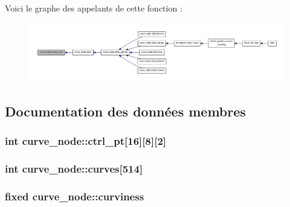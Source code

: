 Voici le graphe des appelants de cette fonction \+:\nopagebreak
\begin{figure}[H]
\begin{center}
\leavevmode
\includegraphics[width=350pt]{classcurve__node_abc1a06d649c6dce22334da762f2955b8_icgraph}
\end{center}
\end{figure}




\subsection{Documentation des données membres}
\hypertarget{classcurve__node_ab7280e17d47152797e10e5992791ee9b}{
\subsubsection[{ctrl\+\_\+pt}]{\setlength{\rightskip}{0pt plus 5cm}int curve\+\_\+node\+::ctrl\+\_\+pt\mbox{[}16\mbox{]}\mbox{[}8\mbox{]}\mbox{[}2\mbox{]}\hspace{0.3cm}{\ttfamily [static]}}}\label{classcurve__node_ab7280e17d47152797e10e5992791ee9b}
\hypertarget{classcurve__node_a0aebfec8e10d7fc02442cd5326433c93}{
\subsubsection[{curves}]{\setlength{\rightskip}{0pt plus 5cm}int curve\+\_\+node\+::curves\mbox{[}514\mbox{]}\hspace{0.3cm}{\ttfamily [static]}}}\label{classcurve__node_a0aebfec8e10d7fc02442cd5326433c93}
\hypertarget{classcurve__node_a46e1f23c6d19a1ca915697c80ed72a84}{
\subsubsection[{curviness}]{\setlength{\rightskip}{0pt plus 5cm}fixed curve\+\_\+node\+::curviness\hspace{0.3cm}{\ttfamily [static]}}}\label{classcurve__node_a46e1f23c6d19a1ca915697c80ed72a84}
